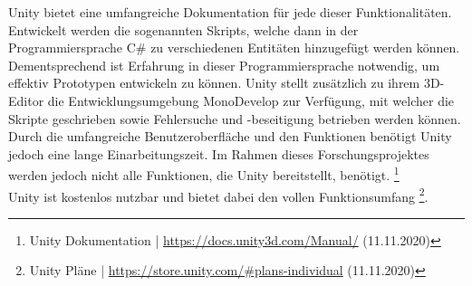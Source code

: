 \documentclass[a4paper,12pt,oneside]{article}
\begin{document}
        Unity bietet eine umfangreiche Dokumentation für jede dieser Funktionalitäten.
        Entwickelt werden die sogenannten Skripts, welche dann in der Programmiersprache
        C\# zu verschiedenen Entitäten hinzugefügt werden können. Dementsprechend ist
        Erfahrung in dieser Programmiersprache notwendig, um effektiv Prototypen
        entwickeln zu können. 
        Unity stellt zusätzlich zu ihrem 3D-Editor die 
        Entwicklungsumgebung MonoDevelop zur Verfügung, mit welcher die Skripte 
        geschrieben sowie Fehlersuche und -beseitigung betrieben werden können.
        Durch die umfangreiche Benutzeroberfläche und den Funktionen benötigt Unity jedoch 
        eine lange Einarbeitungszeit. 
        Im Rahmen dieses Forschungsprojektes werden jedoch nicht alle Funktionen,
        die Unity bereitstellt, benötigt.
        \footnote{Unity Dokumentation | \url{https://docs.unity3d.com/Manual/} (11.11.2020)}
        \\
        Unity ist kostenlos nutzbar und bietet dabei den vollen Funktionsumfang \footnote{Unity Pläne | \url{https://store.unity.com/\#plans-individual} (11.11.2020)}.
\end{document}
